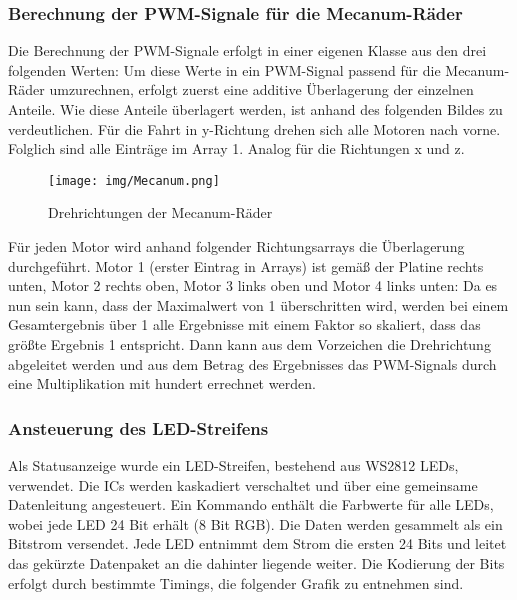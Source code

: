 \documentclass[12pt, a4paper]{report}
\begin{document}
            \subsubsection{Berechnung der PWM-Signale für die Mecanum-Räder}
            Die Berechnung der PWM-Signale erfolgt in einer eigenen Klasse aus den drei folgenden Werten: 
            \noindent Um diese Werte in ein PWM-Signal passend für die Mecanum-Räder umzurechnen, erfolgt zuerst eine additive Überlagerung der einzelnen Anteile. Wie diese Anteile überlagert werden, ist anhand des folgenden Bildes zu verdeutlichen. Für die Fahrt in y-Richtung drehen sich alle Motoren nach vorne. Folglich sind alle Einträge im Array 1. Analog für die Richtungen x und z.\\
            \begin{figure}[!ht]
                \centering
                \texttt{[image: img/Mecanum.png]}
                \caption{Drehrichtungen der Mecanum-Räder \cite{wikipediaMecanum}}
            \end{figure}
            \FloatBarrier
            Für jeden Motor wird anhand folgender Richtungsarrays die Überlagerung durchgeführt. Motor 1 (erster Eintrag in Arrays) ist gemäß der Platine rechts unten, Motor 2 rechts oben, Motor 3 links oben und Motor 4 links unten:
            Da es nun sein kann, dass der Maximalwert von 1 überschritten wird, werden bei einem Gesamtergebnis über 1 alle Ergebnisse mit einem Faktor so skaliert, dass das größte Ergebnis 1 entspricht. Dann kann aus dem Vorzeichen die Drehrichtung abgeleitet werden und aus dem Betrag des Ergebnisses das PWM-Signals durch eine Multiplikation mit hundert errechnet werden.
            
                
           \subsubsection{Ansteuerung des LED-Streifens}\label{ws2812}
            Als Statusanzeige wurde ein LED-Streifen, bestehend aus WS2812 LEDs, verwendet. Die ICs werden kaskadiert verschaltet und über eine gemeinsame Datenleitung angesteuert. Ein Kommando enthält die Farbwerte für alle LEDs, wobei jede LED 24 Bit erhält (8 Bit RGB). Die Daten werden gesammelt als ein Bitstrom versendet. Jede LED entnimmt dem Strom die ersten 24 Bits und leitet das gekürzte Datenpaket an die dahinter liegende weiter.
            Die Kodierung der Bits erfolgt durch bestimmte Timings, die folgender Grafik zu entnehmen sind.
\end{document}
